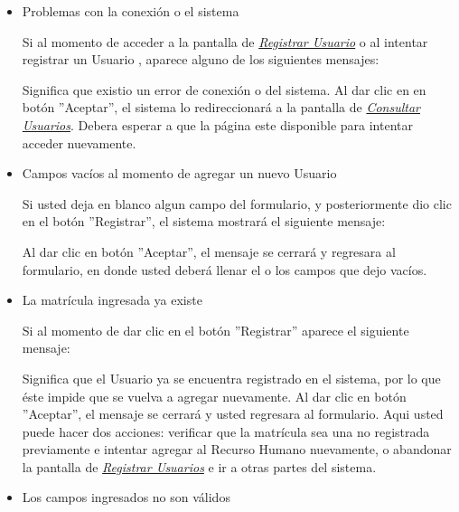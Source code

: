                \begin{itemize}
                    \item Problemas con la conexión o el sistema
                
                        Si al momento de acceder a la pantalla de \hyperlink{registrarUs}{\textit{Registrar Usuario}} o al intentar registrar un Usuario , aparece alguno de los siguientes mensajes:
                    
                        Significa que existio un error de conexión o del sistema. Al dar clic en en botón ''Aceptar'', el sistema lo redireccionará a la pantalla de \hyperlink{consultaUs}{\textit{Consultar Usuarios}}. Debera esperar a que la página este disponible para  intentar acceder nuevamente.
                    
                    \item Campos vacíos al momento de agregar un nuevo Usuario
                
                        Si usted deja en blanco algun campo del formulario, y posteriormente dio clic en el botón ''Registrar'', el sistema mostrará el siguiente mensaje:
                    
                        Al dar clic en botón ''Aceptar'', el mensaje se cerrará y regresara  al formulario, en donde usted deberá llenar el o los campos que dejo vacíos. 
                    
                    \item La matrícula ingresada ya existe
                
                        Si al momento de dar clic en el botón ''Registrar'' aparece el siguiente mensaje:
                    
                        Significa que el Usuario ya se encuentra registrado en el sistema, por lo que éste impide que se vuelva a agregar nuevamente. Al dar clic en botón ''Aceptar'', el mensaje se cerrará y usted regresara al formulario. Aqui usted puede hacer dos acciones: verificar que la matrícula sea una no registrada previamente e intentar agregar al Recurso Humano nuevamente, o abandonar la pantalla de \hyperlink{registrarUs}{\textit{Registrar Usuarios}} e ir a otras partes del sistema.
                    
                    \item Los campos ingresados no son válidos
                

\end{itemize}
